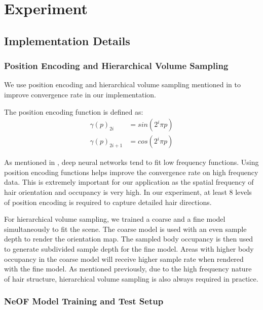 \documentclass{article}
\begin{document}
\section{Experiment}


\subsection{Implementation Details}

\subsubsection{Position Encoding and Hierarchical Volume Sampling}

We use position encoding and hierarchical volume sampling mentioned in \cite{mildenhall_nerf_2020} to improve convergence rate in our implementation.

The position encoding function is defined as:
\begin{align}
    \gamma(p)_{2i} &= sin(2^{i} \pi p) \\
    \gamma(p)_{2i + 1} &= cos(2^{i} \pi p)
\end{align}

As mentioned in \cite{mildenhall_nerf_2020}, deep neural networks tend to fit low frequency functions. Using position encoding functions helps improve the convergence rate on high frequency data. This is extremely important for our application as the spatial frequency of hair orientation and occupancy is very high. In our experiment, at least 8 levels of position encoding is required to capture detailed hair directions.

For hierarchical volume sampling, we trained a coarse and a fine model simultaneously to fit the scene. The coarse model is used with an even sample depth to render the orientation map. The sampled body occupancy is then used to generate subdivided sample depth for the fine model. Areas with higher body occupancy in the coarse model will receive higher sample rate when rendered with the fine model. As mentioned previously, due to the high frequency nature of hair structure, hierarchical volume sampling is also always required in practice.

\subsubsection{NeOF Model Training and Test Setup}
\end{document}

